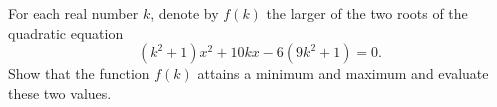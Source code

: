 For each real number $k$, denote by $f(k)$ the larger of the two roots of the quadratic equation
$$(k^2+1)x^2+10kx-6(9k^2+1)=0.$$Show that the function $f(k)$ attains a minimum and maximum and evaluate these two values.